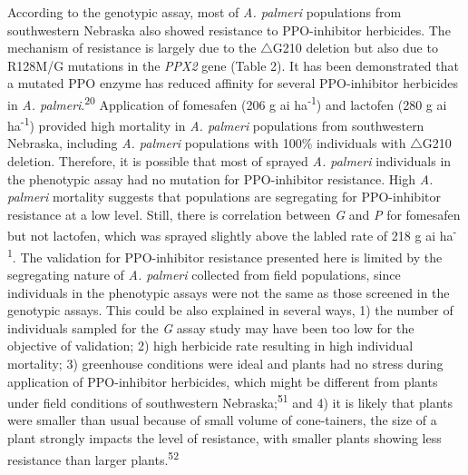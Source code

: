 \documentclass[
  12pt,
  a4paper]{article}
\begin{document}
According to the genotypic assay, most of \emph{A. palmeri} populations
from southwestern Nebraska also showed resistance to PPO-inhibitor
herbicides. The mechanism of resistance is largely due to the
\(\triangle\)G210 deletion but also due to R128M/G mutations in the
\emph{PPX2} gene (Table 2). It has been demonstrated that a mutated PPO
enzyme has reduced affinity for several PPO-inhibitor herbicides in
\emph{A. palmeri}.\textsuperscript{20} Application of fomesafen (206 g
ai ha\textsuperscript{-1}) and lactofen (280 g ai
ha\textsuperscript{-1}) provided high mortality in \emph{A. palmeri}
populations from southwestern Nebraska, including \emph{A. palmeri}
populations with 100\% individuals with \(\triangle\)G210 deletion.
Therefore, it is possible that most of sprayed \emph{A. palmeri}
individuals in the phenotypic assay had no mutation for PPO-inhibitor
resistance. High \emph{A. palmeri} mortality suggests that populations
are segregating for PPO-inhibitor resistance at a low level. Still,
there is correlation between \emph{G} and \emph{P} for fomesafen but not
lactofen, which was sprayed slightly above the labled rate of 218 g ai
ha\textsuperscript{-1}. The validation for PPO-inhibitor resistance
presented here is limited by the segregating nature of \emph{A. palmeri}
collected from field populations, since individuals in the phenotypic
assays were not the same as those screened in the genotypic assays. This
could be also explained in several ways, 1) the number of individuals
sampled for the \emph{G} assay study may have been too low for the
objective of validation; 2) high herbicide rate resulting in high
individual mortality; 3) greenhouse conditions were ideal and plants had
no stress during application of PPO-inhibitor herbicides, which might be
different from plants under field conditions of southwestern
Nebraska;\textsuperscript{51} and 4) it is likely that plants were
smaller than usual because of small volume of cone-tainers, the size of
a plant strongly impacts the level of resistance, with smaller plants
showing less resistance than larger plants.\textsuperscript{52}
\end{document}
